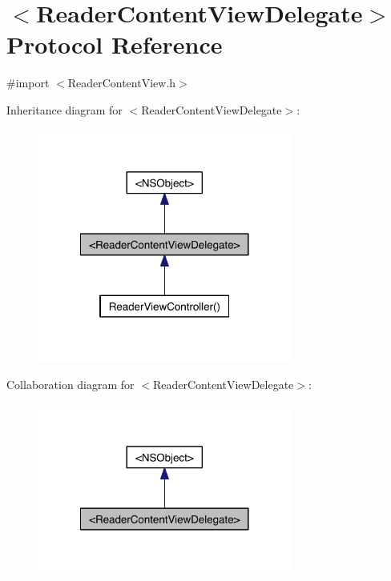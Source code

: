 \hypertarget{protocol_reader_content_view_delegate-p}{\section{$<$Reader\-Content\-View\-Delegate$>$ Protocol Reference}
\label{d5/d7d/protocol_reader_content_view_delegate-p}
}


{\ttfamily \#import $<$Reader\-Content\-View.\-h$>$}



Inheritance diagram for $<$Reader\-Content\-View\-Delegate$>$\-:
\nopagebreak
\begin{figure}[H]
\begin{center}
\leavevmode
\includegraphics[width=236pt]{d8/dfb/protocol_reader_content_view_delegate-p__inherit__graph}
\end{center}
\end{figure}


Collaboration diagram for $<$Reader\-Content\-View\-Delegate$>$\-:
\nopagebreak
\begin{figure}[H]
\begin{center}
\leavevmode
\includegraphics[width=236pt]{db/d22/protocol_reader_content_view_delegate-p__coll__graph}
\end{center}
\end{figure}
